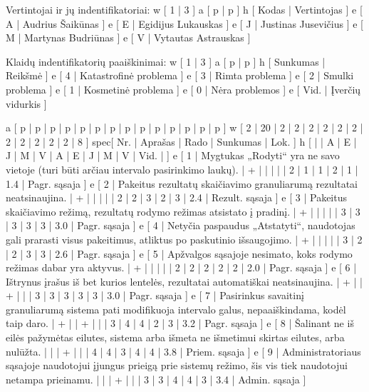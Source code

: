 Vertintojai ir jų indentifikatoriai:
\xtableu
{
  w [ 1 | 3 ]
  a [ p | p ]
  h [ Kodas | Vertintojas ]
  e [ A | Audrius Šaikūnas ]
  e [ E | Egidijus Lukauskas ]
  e [ J | Justinas Jusevičius ]
  e [ M | Martynas Budriūnas ]
  e [ V | Vytautas Astrauskas ]
}

Klaidų indentifikatorių paaiškinimai:
\xtableu
{
  w [ 1 | 3 ]
  a [ p | p ]
  h [ Sunkumas | Reikšmė ]
  e [ 4 | Katastrofinė problema ]
  e [ 3 | Rimta problema ]
  e [ 2 | Smulki problema ]
  e [ 1 | Kosmetinė problema ]
  e [ 0 | Nėra problemos ]
  e [ Vid. | Įverčių vidurkis ]
}

\xtableu
{
  a [ p   | p       | p | p | p | p | p | p | p | p | p | p | p    | p    ]
  w [ 2   | 20      | 2 | 2 | 2 | 2 | 2 | 2 | 2 | 2 | 2 | 2 | 2    | 8    ]
spec[ Nr. | Aprašas | Rado              | Sunkumas                 | Lok. ]
  h [     |         | A | E | J | M | V | A | E | J | M | V | Vid. |      ]
  e [ 1   | Mygtukas „Rodyti“ yra ne savo vietoje (turi būti arčiau intervalo
  pasirinkimo laukų).
                    | + |   |   |   |   | 2 | 1 | 1 | 2 | 1 | 1.4  | Pagr. sąsaja ]
  e [ 2   | Pakeitus rezultatų skaičiavimo granuliarumą rezultatai neatsinaujina.
                    | + |   |   |   |   | 2 | 2 | 3 | 2 | 3 | 2.4  | Rezult. sąsaja ]
  e [ 3   | Pakeitus skaičiavimo režimą, rezultatų rodymo režimas atsistato
  į pradinį.
                    | + |   |   |   |   | 3 | 3 | 3 | 3 | 3 | 3.0  | Pagr. sąsaja ]
  e [ 4   | Netyčia paspaudus „Atstatyti“, naudotojas gali prarasti visus pakeitimus,
  atliktus po paskutinio išsaugojimo.
                    | + |   |   |   |   | 3 | 2 | 2 | 3 | 3 | 2.6  | Pagr. sąsaja ]
  e [ 5   | Apžvalgos sąsajoje nesimato, koks rodymo režimas dabar yra aktyvus.
                    | + |   |   |   |   | 2 | 2 | 2 | 2 | 2 | 2.0  | Pagr. sąsaja ]
  e [ 6   | Ištrynus įrašus iš bet kurios lentelės, rezultatai automatiškai neatsinaujina.
                    | + |   | + |   |   | 3 | 3 | 3 | 3 | 3 | 3.0  | Pagr. sąsaja ]
  e [ 7   | Pasirinkus savaitinį granuliarumą sistema pati modifikuoja intervalo galus,
  nepaaiškindama, kodėl taip daro.
                    | + |   | + |   |   | 3 | 4 | 4 | 2 | 3 | 3.2  | Pagr. sąsaja ]
  e [ 8   | Šalinant ne iš eilės pažymėtas eilutes, sistema arba išmeta ne išmetimui
  skirtas eilutes, arba nulūžta.
                    |   |   | + |   |   | 4 | 4 | 3 | 4 | 4 | 3.8  | Priem. sąsaja ]
  e [ 9   | Administratoriaus sąsajoje naudotojui įjungus prieigą prie sistemų
  režimo, šis vis tiek naudotojui netampa prieinamu.
                    |   |   | + |   |   | 3 | 3 | 4 | 4 | 3 | 3.4  | Admin. sąsaja ]
}
